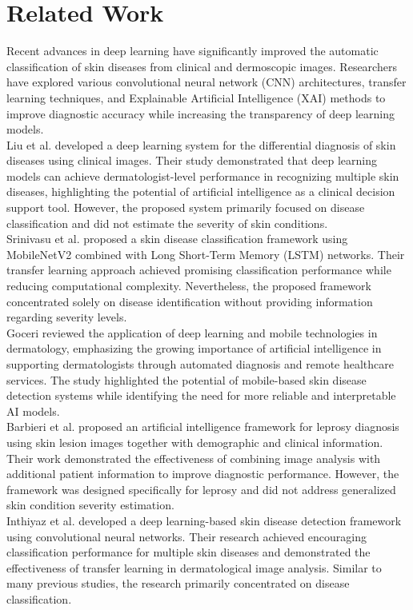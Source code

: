 \section{Related Work}
Recent advances in deep learning have significantly improved the automatic classification of skin diseases from clinical and dermoscopic images. Researchers have explored various convolutional neural network (CNN) architectures, transfer learning techniques, and Explainable Artificial Intelligence (XAI) methods to improve diagnostic accuracy while increasing the transparency of deep learning models.\\
Liu et al.\cite{Liu2020} developed a deep learning system for the differential diagnosis of skin diseases using clinical images. Their study demonstrated that deep learning models can achieve dermatologist-level performance in recognizing multiple skin diseases, highlighting the potential of artificial intelligence as a clinical decision support tool. However, the proposed system primarily focused on disease classification and did not estimate the severity of skin conditions.\\
Srinivasu et al.\cite{Srinivasu2021} proposed a skin disease classification framework using MobileNetV2 combined with Long Short-Term Memory (LSTM) networks. Their transfer learning approach achieved promising classification performance while reducing computational complexity. Nevertheless, the proposed framework concentrated solely on disease identification without providing information regarding severity levels.\\
Goceri\cite{Goceri2021} reviewed the application of deep learning and mobile technologies in dermatology, emphasizing the growing importance of artificial intelligence in supporting dermatologists through automated diagnosis and remote healthcare services. The study highlighted the potential of mobile-based skin disease detection systems while identifying the need for more reliable and interpretable AI models.\\
Barbieri et al.\cite{Barbieri2022} proposed an artificial intelligence framework for leprosy diagnosis using skin lesion images together with demographic and clinical information. Their work demonstrated the effectiveness of combining image analysis with additional patient information to improve diagnostic performance. However, the framework was designed specifically for leprosy and did not address generalized skin condition severity estimation.\\
Inthiyaz et al.\cite{Inthiyaz2023} developed a deep learning-based skin disease detection framework using convolutional neural networks. Their research achieved encouraging classification performance for multiple skin diseases and demonstrated the effectiveness of transfer learning in dermatological image analysis. Similar to many previous studies, the research primarily concentrated on disease classification.\\
